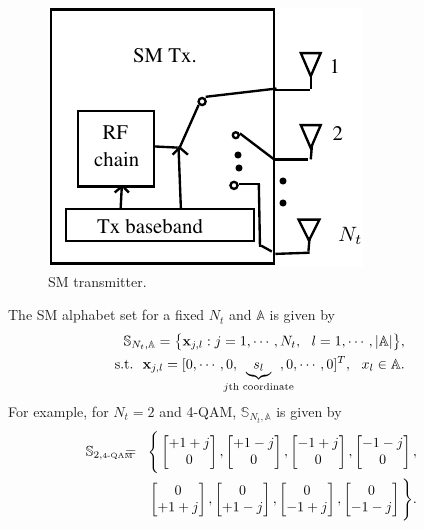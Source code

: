 \documentclass[11pt, onecolumn]{report}
\newcommand{\sm}{{\mathbb S}_{N_t,{\mathbb A}}}
\newcommand{\sa}{{\mathbb A}}
\begin{document}
\begin{figure}[htb]
\centering

\includegraphics[scale=1]{smtransmit.pdf}
\caption{SM transmitter.}
\label{smtrans}
\end{figure}

The SM alphabet set for a fixed $N_t$ and $\sa$ is given by 
\begin{eqnarray}
\sm = 
\big \{ {\bf x}_{j,l}:j=1,\cdots,N_t, \ \ l=1,\cdots,|{\mathbb A}| \big \}, \nonumber \\ 
\mbox{s.t.} \ \ {\bf x}_{j,l} = 
[0,\cdots,0,\hspace{-4mm}\underbrace{s_{l}}_{{\scriptsize{\mbox{$j$th coordinate}}}}\hspace{-3.5mm},0,\cdots,0]^T, \ \ x_l \in \mathbb{A}.  
\end{eqnarray}
For example, for $N_t=2$ and 4-QAM, ${\mathbb S}_{N_t,{\mathbb A}}$ is given by  
{\small
\begin{eqnarray}
\hspace{-4mm}
{\mathbb S}_{2,\mbox{{\tiny 4-QAM}}}  
\hspace{-3mm}&=&\hspace{-3mm}\Bigg\{ 
\begin{bmatrix} +1+j \\ 0 \end{bmatrix}, 
\begin{bmatrix} +1-j \\ 0 \end{bmatrix}, 
\begin{bmatrix} -1+j \\ 0 \end{bmatrix}, 
\begin{bmatrix} -1-j \\ 0 \end{bmatrix}, \nonumber \\ 
& & 
\begin{bmatrix} 0 \\ +1+j \end{bmatrix}, 
\begin{bmatrix} 0 \\ +1-j \end{bmatrix}, 
\begin{bmatrix} 0 \\ -1+j \end{bmatrix}, 
\begin{bmatrix} 0 \\ -1-j \end{bmatrix} 
\Bigg \}. 
\end{eqnarray}
}
\end{document}
